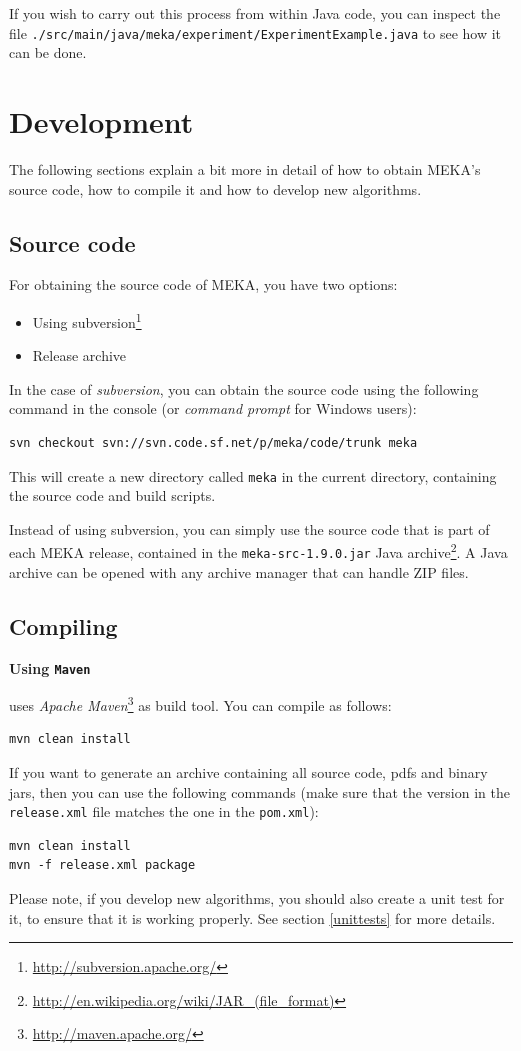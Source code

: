 \documentclass[11pt]{article}
\newcommand{\MEKA}{Meka}
\def\version{{\tt 1.9.0}}
\newcommand{\heading}[1]{
    \vspace{0.3cm} \noindent \textbf{#1} \newline
}
\begin{document}
If you wish to carry out this process from within Java code, you can inspect the file \texttt{./src/main/java/meka/experiment/ExperimentExample.java} to see how it can be done.

\section{Development}
\label{development}
The following sections explain a bit more in detail of how to obtain MEKA's source code, how to compile it and how to develop new algorithms.

\subsection{Source code}
\label{sourcecode}
For obtaining the source code of MEKA, you have two options:
\begin{itemize}
  \item Using subversion\footnote{\url{http://subversion.apache.org/}}
  \item Release archive
\end{itemize}

\noindent In the case of \textit{subversion}, you can obtain the source code using the following command in the console (or \textit{command prompt} for Windows users):
\begin{lstlisting}
svn checkout svn://svn.code.sf.net/p/meka/code/trunk meka
\end{lstlisting}
This will create a new directory called \texttt{meka} in the current directory, containing the source code and build scripts.

Instead of using subversion, you can simply use the source code that is part of each MEKA release, contained in the \texttt{meka-src-\version.jar} Java archive\footnote{\url{http://en.wikipedia.org/wiki/JAR\_(file\_format)}}. A Java archive can be opened with any archive manager that can handle ZIP files.

\subsection{Compiling}
\label{compiling}
\heading{Using \texttt{Maven}}
\framework{\MEKA} uses \textit{Apache Maven}\footnote{\url{http://maven.apache.org/}} as build tool. You can compile \framework{\MEKA} as follows:
\begin{lstlisting}
mvn clean install
\end{lstlisting}
If you want to generate an archive containing all source code, pdfs and binary jars, then you can use the following commands
(make sure that the version in the \texttt{release.xml} file matches the one in the \texttt{pom.xml}):
\begin{lstlisting}
mvn clean install
mvn -f release.xml package
\end{lstlisting}
Please note, if you develop new algorithms, you should also create a unit test for it, to ensure that it is working properly. See section \ref{unittests} for more details.
\end{document}

